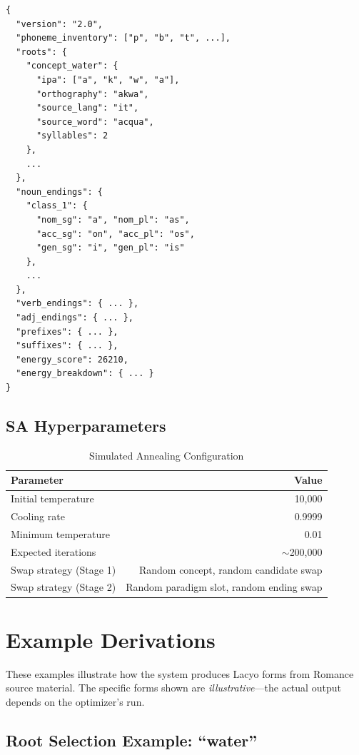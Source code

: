 \documentclass[12pt]{book}
\begin{document}
\begin{verbatim}
{
  "version": "2.0",
  "phoneme_inventory": ["p", "b", "t", ...],
  "roots": {
    "concept_water": {
      "ipa": ["a", "k", "w", "a"],
      "orthography": "akwa",
      "source_lang": "it",
      "source_word": "acqua",
      "syllables": 2
    },
    ...
  },
  "noun_endings": {
    "class_1": {
      "nom_sg": "a", "nom_pl": "as",
      "acc_sg": "on", "acc_pl": "os",
      "gen_sg": "i", "gen_pl": "is"
    },
    ...
  },
  "verb_endings": { ... },
  "adj_endings": { ... },
  "prefixes": { ... },
  "suffixes": { ... },
  "energy_score": 26210,
  "energy_breakdown": { ... }
}
\end{verbatim}

\section{SA Hyperparameters}

\begin{table}[h]
\centering
\caption{Simulated Annealing Configuration}
\begin{tabular}{@{}lr@{}}
\toprule
Parameter                & Value \\
\midrule
Initial temperature      & 10,000 \\
Cooling rate             & 0.9999 \\
Minimum temperature      & 0.01 \\
Expected iterations      & $\sim$200,000 \\
Swap strategy (Stage 1)  & Random concept, random candidate swap \\
Swap strategy (Stage 2)  & Random paradigm slot, random ending swap \\
\bottomrule
\end{tabular}
\end{table}


\chapter{Example Derivations}
\label{ch:examples}

These examples illustrate how the system produces Lacyo forms from Romance
source material. The specific forms shown are \emph{illustrative}---the
actual output depends on the optimizer's run.

\section{Root Selection Example: ``water''}
\end{document}
